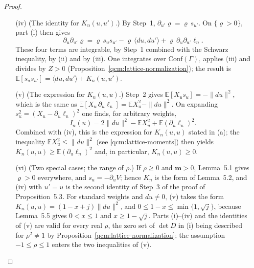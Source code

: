 \documentclass[11pt,letterpaper,reqno]{amsart}
\theoremstyle{definition}
\begin{document}
\begin{proof}
\begin{itemize}
By Step~1 of the proof of Proposition~5.3 and Definition~\ref{qcm:lattice-setting}, the integral $\int\mathrm d(A,z)\,(\partial_{u'}\varrho)(A+tu,z)$ does not depend on $t$.
When $|t|\le1$, the derivative in $t$ of the integrand, namely $(\partial_u\partial_{u'}\varrho)(A+tu,z)$, is bounded in modulus by $C\prod_\sigma\exp(-\frac14F_\sigma^2)$ for some constant $C$, and this function is integrable, as in Step~2 of that proof (Proposition~\ref{qcm:lattice-normalization}).
Differentiating at $t=0$, one obtains
\begin{equation*}
\int\mathrm d(A,z)\,\partial_u\partial_{u'}\varrho=0.
\end{equation*}
\item[(iv)] (The identity for $K_n(u,u')$.)
By Step~1, $\partial_{u'}\varrho=\varrho\,s_{u'}$.
On $\{\varrho>0\}$, part (i) then gives
\begin{equation*}
\partial_u\partial_{u'}\varrho=\varrho\,s_us_{u'}-\varrho\,\langle du,du'\rangle+\varrho\,\partial_u\partial_{u'}\ell_n.
\end{equation*}
These four terms are integrable, by Step~1 combined with the Schwarz inequality, by (ii) and by (iii).
One integrates over $\mathrm{Conf}(\Gamma)$, applies (iii) and divides by $Z>0$ (Proposition~\ref{qcm:lattice-normalization}); the result is $\mathbb E[s_us_{u'}]=\langle du,du'\rangle+K_n(u,u')$.
\item[(v)] (The expression for $K_n(u,u)$.)
Step~2 gives $\mathbb E[X_us_u]=-\|du\|^2$, which is the same as $\mathbb E[X_u\,\partial_u\ell_n]=\mathbb EX_u^2-\|du\|^2$.
On expanding $s_u^2=(X_u-\partial_u\ell_n)^2$ one finds, for arbitrary weights,
\begin{equation*}
I_n(u)=2\|du\|^2-\mathbb EX_u^2+\mathbb E(\partial_u\ell_n)^2.
\end{equation*}
Combined with (iv), this is the expression for $K_n(u,u)$ stated in (a); the inequality $\mathbb EX_u^2\le\|du\|^2$ (see \eqref{qcm:lattice-moments}) then yields $K_n(u,u)\ge\mathbb E(\partial_u\ell_n)^2$ and, in particular, $K_n(u,u)\ge0$.
\item[(vi)] (Two special cases; the range of $\rho$.)
If $\rho\ge0$ and $\mathbf m>0$, Lemma~5.1 gives $\varrho>0$ everywhere, and $s_u=-\partial_uV$; hence $K_n$ is the form of Lemma~5.2, and (iv) with $u'=u$ is the second identity of Step~3 of the proof of Proposition~5.3.
For standard weights and $du\ne0$, (v) takes the form $K_n(u,u)=(1-x+j)\|du\|^2$, and $0\le1-x\le\min\{1,\sqrt j\}$, because Lemma~5.5 gives $0<x\le1$ and $x\ge1-\sqrt j$.
Parts (i)--(iv) and the identities of (v) are valid for every real $\rho$, the zero set of $\det D$ in (i) being described for $\rho^2\ne1$ by Proposition~\ref{qcm:lattice-normalization}; the assumption $-1\le\rho\le1$ enters the two inequalities of (v).
\end{itemize}


\end{proof}
\end{document}

